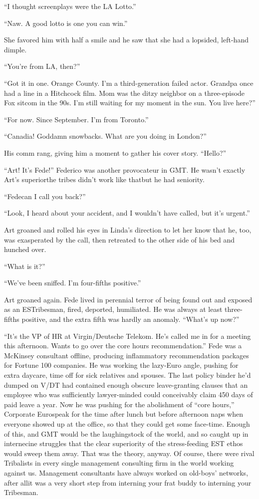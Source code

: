 “I thought screenplays were the LA Lotto.”

“Naw. A good lotto is one you can win.”

She favored him with half a smile and he saw that she had a
lopsided, left-hand dimple.

“You’re from LA, then?”

“Got it in one. Orange County. I’m a third-generation failed actor.
Grandpa once had a line in a Hitchcock film. Mom was the ditzy
neighbor on a three-episode Fox sitcom in the 90s. I’m still
waiting for my moment in the sun. You live here?”

“For now. Since September. I’m from Toronto.”

“Canadia! Goddamn snowbacks. What are you doing in London?”

His comm rang, giving him a moment to gather his cover story.
“Hello?”

“Art! It’s Fede!” Federico was another provocateur in GMT. He
wasn’t exactly Art’s superior{\dash}the tribes didn’t work like that{\dash}but
he had seniority.

“Fede{\dash}can I call you back?”

“Look, I heard about your accident, and I wouldn’t have called, but
it’s urgent.”

Art groaned and rolled his eyes in Linda’s direction to let her
know that he, too, was exasperated by the call, then retreated to
the other side of his bed and hunched over.

“What is it?”

“We’ve been sniffed. I’m four-fifths positive.”

Art groaned again. Fede lived in perennial terror of being found
out and exposed as an ESTribesman, fired, deported, humiliated. He
was always at least three-fifths positive, and the extra fifth was
hardly an anomaly. “What’s up now?”

“It’s the VP of HR at Virgin/Deutsche Te\-le\-kom. He’s called me in
for a meeting this afternoon. Wants to go over the core hours
recommendation.” Fede was a McKinsey consultant offline, producing
inflammatory recommendation packages for Fortune 100 companies. He
was working the lazy-Euro angle, pushing for extra daycare, time
off for sick relatives and spouses. The last policy binder he’d
dumped on V/DT had contained enough obscure leave-granting clauses
that an employee who was sufficiently lawyer-minded could
conceivably claim 450 days of paid leave a year. Now he was pushing
for the abolishment of “core hours,” Corporate Eurospeak for the
time after lunch but before afternoon naps when everyone showed up
at the office, so that they could get some face-time. Enough of
this, and GMT would be the laughingstock of the world, and so
caught up in internecine struggles that the clear superiority of
the stress-feeding EST ethos would sweep them away. That was the
theory, anyway. Of course, there were rival Tribalists in every
single management consulting firm in the world working against us.
Management consultants have always worked on old-boys’ networks,
after all{\dash}it was a very short step from interning your frat buddy
to interning your Tribesman.

